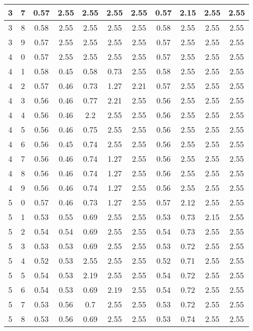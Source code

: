 \begin{longtable}{|c|c||c||c|c|c|c||c|c|c|c|}
	3 & 7 & 0.57 & 2.55 & 2.55 & 2.55 & 2.55 & 0.57 & 2.15 & 2.55 & 2.55 \\ \hline
	3 & 8 & 0.58 & 2.55 & 2.55 & 2.55 & 2.55 & 0.58 & 2.55 & 2.55 & 2.55 \\ \hline
	3 & 9 & 0.57 & 2.55 & 2.55 & 2.55 & 2.55 & 0.57 & 2.55 & 2.55 & 2.55 \\ \hline
	4 & 0 & 0.57 & 2.55 & 2.55 & 2.55 & 2.55 & 0.57 & 2.55 & 2.55 & 2.55 \\ \hline
	4 & 1 & 0.58 & 0.45 & 0.58 & 0.73 & 2.55 & 0.58 & 2.55 & 2.55 & 2.55 \\ \hline
	4 & 2 & 0.57 & 0.46 & 0.73 & 1.27 & 2.21 & 0.57 & 2.55 & 2.55 & 2.55 \\ \hline
	4 & 3 & 0.56 & 0.46 & 0.77 & 2.21 & 2.55 & 0.56 & 2.55 & 2.55 & 2.55 \\ \hline
	4 & 4 & 0.56 & 0.46 & 2.2 & 2.55 & 2.55 & 0.56 & 2.55 & 2.55 & 2.55 \\ \hline
	4 & 5 & 0.56 & 0.46 & 0.75 & 2.55 & 2.55 & 0.56 & 2.55 & 2.55 & 2.55 \\ \hline
	4 & 6 & 0.56 & 0.45 & 0.74 & 2.55 & 2.55 & 0.56 & 2.55 & 2.55 & 2.55 \\ \hline
	4 & 7 & 0.56 & 0.46 & 0.74 & 1.27 & 2.55 & 0.56 & 2.55 & 2.55 & 2.55 \\ \hline
	4 & 8 & 0.56 & 0.46 & 0.74 & 1.27 & 2.55 & 0.56 & 2.55 & 2.55 & 2.55 \\ \hline
	4 & 9 & 0.56 & 0.46 & 0.74 & 1.27 & 2.55 & 0.56 & 2.55 & 2.55 & 2.55 \\ \hline
	5 & 0 & 0.57 & 0.46 & 0.73 & 1.27 & 2.55 & 0.57 & 2.12 & 2.55 & 2.55 \\ \hline
	5 & 1 & 0.53 & 0.55 & 0.69 & 2.55 & 2.55 & 0.53 & 0.73 & 2.15 & 2.55 \\ \hline
	5 & 2 & 0.54 & 0.54 & 0.69 & 2.55 & 2.55 & 0.54 & 0.73 & 2.55 & 2.55 \\ \hline
	5 & 3 & 0.53 & 0.53 & 0.69 & 2.55 & 2.55 & 0.53 & 0.72 & 2.55 & 2.55 \\ \hline
	5 & 4 & 0.52 & 0.53 & 2.55 & 2.55 & 2.55 & 0.52 & 0.71 & 2.55 & 2.55 \\ \hline
	5 & 5 & 0.54 & 0.53 & 2.19 & 2.55 & 2.55 & 0.54 & 0.72 & 2.55 & 2.55 \\ \hline
	5 & 6 & 0.54 & 0.53 & 0.69 & 2.19 & 2.55 & 0.54 & 0.72 & 2.55 & 2.55 \\ \hline
	5 & 7 & 0.53 & 0.56 & 0.7 & 2.55 & 2.55 & 0.53 & 0.72 & 2.55 & 2.55 \\ \hline
	5 & 8 & 0.53 & 0.56 & 0.69 & 2.55 & 2.55 & 0.53 & 0.74 & 2.55 & 2.55 \\ \hline

\end{longtable}
